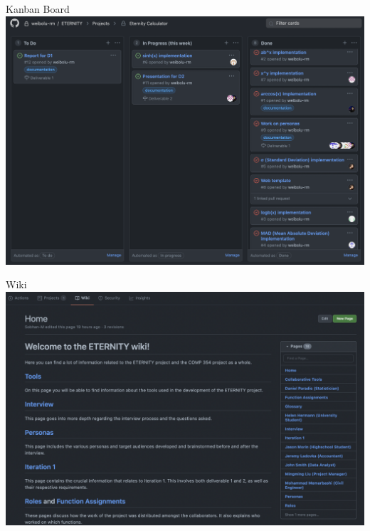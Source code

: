 \documentclass[12pt]{beamer}
\begin{document}
\begin{frame}{Kanban Board}
\includegraphics[width=1\linewidth]{images/kanban.png}
\end{frame}

\begin{frame}{Wiki}
\includegraphics[width=1\linewidth]{images/wiki.png}
\end{frame}
\end{document}
